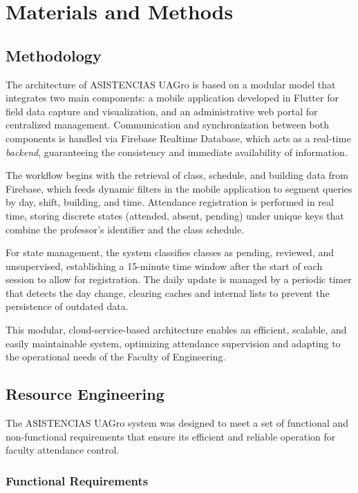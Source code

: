 \documentclass[journal=information,article,submit,pdftex,oneauthor]{Definitions/mdpi}
\begin{document}
	\section{Materials and Methods}
	
	\subsection{Methodology}
	
	The architecture of ASISTENCIAS UAGro is based on a modular model that integrates two main components: a mobile application developed in Flutter for field data capture and visualization, and an administrative web portal for centralized management. Communication and synchronization between both components is handled via Firebase Realtime Database, which acts as a real-time \emph{backend}, guaranteeing the consistency and immediate availability of information.
	
	The workflow begins with the retrieval of class, schedule, and building data from Firebase, which feeds dynamic filters in the mobile application to segment queries by day, shift, building, and time. Attendance registration is performed in real time, storing discrete states (attended, absent, pending) under unique keys that combine the professor's identifier and the class schedule.
	
	For state management, the system classifies classes as pending, reviewed, and unsupervised, establishing a 15-minute time window after the start of each session to allow for registration. The daily update is managed by a periodic timer that detects the day change, clearing caches and internal lists to prevent the persistence of outdated data.
	
	This modular, cloud-service-based architecture enables an efficient, scalable, and easily maintainable system, optimizing attendance supervision and adapting to the operational needs of the Faculty of Engineering.
	
	\subsection{Resource Engineering}
	
	The ASISTENCIAS UAGro system was designed to meet a set of functional and non-functional requirements that ensure its efficient and reliable operation for faculty attendance control.
	
	\subsubsection{Functional Requirements}
	
\end{document}
